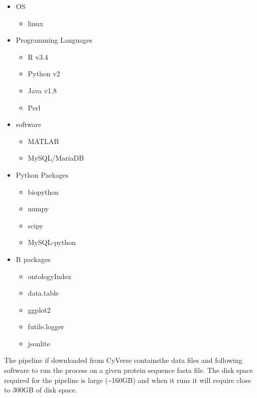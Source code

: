 \documentclass[11pt,letterpaper]{article}
\begin{document}
\begin{itemize}
 \item OS
 \begin{itemize}
     \item linux
 \end{itemize}


 \item Programming Languages
 \begin{itemize}
   \item R v3.4
   \item Python v2
   \item Java v1.8
   \item Perl
 \end{itemize}

 \item software
 \begin{itemize}
   \item MATLAB
   \item MySQL/MariaDB
 \end{itemize}

 \item Python Packages
 \begin{itemize}
  \item biopython
  \item numpy
  \item scipy
  \item MySQL-python
 \end{itemize}

 \item R packages
 \begin{itemize}
  \item ontologyIndex
  \item data.table
  \item ggplot2
  \item futile.logger
  \item jsonlite
 \end{itemize}

\end{itemize}

The pipeline if downloaded from CyVerse containsthe data files and following software to run the process on a given protein sequence fasta file. The disk space required for the pipeline is large (\textasciitilde{}160GB) and when it runs it will require close to 300GB of disk space.
\end{document}
